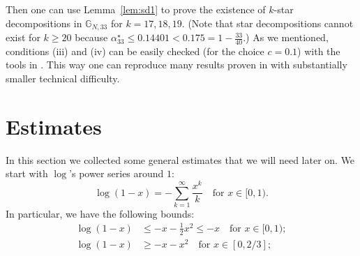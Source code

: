 \documentclass[12pt]{amsart}
\theoremstyle{definition}
\newcommand\Gb{\mathbb{G}}
\newcommand\alstar{\alpha^{\star}}
\begin{document}
\medskip
Then one can use Lemma~\ref{lem:sd1} to prove the existence of $k$-star decompositions in $\Gb_{N,33}$ for $k=17,18,19$. (Note that star decompositions cannot exist for $k \geq 20$ because $\alstar_{33} \leq 0.14401 < 0.175 = 1- \frac{33}{40}$.) As we mentioned, conditions (iii) and (iv) can be easily checked (for the choice $c=0.1$) with the tools in \cite{harangi2025star1}. This way one can reproduce many results proven in \cite{delcourt2025decomposing} with substantially smaller technical difficulty. 



\section{Estimates} \label{sec:estimates}
%
In this section we collected some general estimates that we will need later on. We start with $\log$'s power series around $1$:
%
\begin{equation} \label{eq:log_power_series}
\log(1-x) = - \sum_{k=1}^\infty \frac{x^k}{k} 
\quad \text{for } x \in [0,1) .
\end{equation} 
%
In particular, we have the following bounds: 
%
\begin{align} 
\log(1-x) &\leq -x - \frac12 x^2 \leq -x 
\quad \text{for } x \in [0,1) ; 
\label{eq:log_upp_bnd}\\
\log(1-x) &\geq -x - x^2 
\quad \text{for } x \in [0,2/3] ; 
\label{eq:log_low_bnd1}
\end{align}
% 
\end{document}

